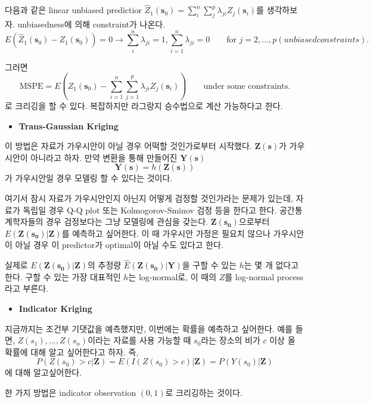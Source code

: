 \documentclass[b5paper,]{scrbook}
\providecommand{\tightlist}{%
  \setlength{\itemsep}{0pt}\setlength{\parskip}{0pt}}
\theoremstyle{plain}
\theoremstyle{definition}
\numberwithin{equation}{section}
\begin{document}
다음과 같은 linear unbiased predictior
\(\hat{Z}_{1}(\mathbf{s}_{0})=\sum_{i}^{n}\sum_{j}^{p}\lambda_{ji}Z_{j}(\mathbf{s}_{i})\)를
생각하보자. unbiasedness에 의해 constraint가 나온다.
\[E(\hat{Z}_{1}(\mathbf{s}_{0})-Z_{1}(\mathbf{s}_{0}))=0 \rightarrow \sum_{i}^{n}\lambda_{ji}=1, \sum_{i=1}^{n}\lambda_{ji}=0 \qquad \text{for } j=2,\ldots, p (unbiased constraints).\]

그러면
\[\text{MSPE}=E(Z_{1}(\mathbf{s}_{0})-\sum_{i=1}^{n}\sum_{j=1}^{p}\lambda_{ji}Z_{j}(\mathbf{s}_{i})) \qquad{\text{under some constraints.}}\]
로 크리깅을 할 수 있다. 복잡하지만 라그랑지 승수법으로 계산 가능하다고
한다.

\begin{itemize}
\tightlist
\item
  \textbf{Trans-Gaussian Kriging}
\end{itemize}

이 방법은 자료가 가우시안이 아닐 경우 어떡할 것인가로부터 시작했다.
\(\mathbf{Z}(\mathbf{s})\)가 가우시안이 아니라고 하자. 만약 변환을 통해
만들어진 \(\mathbf{Y}(\mathbf{s})\)
\[\mathbf{Y}(\mathbf{s})=h(\mathbf{Z}(\mathbf{s}))\] 가 가우시안일 경우
모델링 할 수 있다는 것이다.

여기서 잠시 자료가 가우시안인지 아닌지 어떻게 검정할 것인가라는 문제가
있는데, 자료가 독립일 경우 Q-Q plot 또는 Kolmogorov-Sminov 검정 등을
한다고 한다. 공간통계학자들의 경우 검정보다는 그냥 모델링에 관심을
갖는다. \(\mathbf{Z}(\mathbf{s_{0}})\)으로부터
\(E(\mathbf{Z}(\mathbf{s_{0}})|\mathbf{Z})\)를 예측하고 싶어한다. 이 때
가우시안 가정은 필요치 않으나 가우시안이 아닐 경우 이 predictor가
optimal이 아닐 수도 있다고 한다.

실제로 \(E(\mathbf{Z}(\mathbf{s_{0}})|\mathbf{Z})\)의 추정량
\(\hat{E}(\mathbf{Z}(\mathbf{s_{0}})|\mathbf{Y})\)을 구할 수 있는
\(h\)는 몇 개 없다고 한다. 구할 수 있는 가장 대표적인 \(h\)는
log-normal로, 이 때의 \(Z\)를 log-normal process라고 부른다.

\begin{itemize}
\tightlist
\item
  \textbf{Indicator Kriging}
\end{itemize}

지금까지는 조건부 기댓값을 예측했지만, 이번에는 확률을 예측하고
싶어한다. 예를 들면, \(Z(s_{1}), \ldots , Z(s_{n})\)이라는 자료를 사용
가능할 때 \(s_{0}\)라는 장소의 비가 \(c\) 이상 올 확률에 대해 알고
싶어한다고 하자. 즉,
\[P(Z(s_{0})>c |\mathbf{Z})=E(I(Z(s_{0})>c)|\mathbf{Z})=P(Y(s_{0})|\mathbf{Z})\]
에 대해 알고싶어한다.

한 가지 방법은 indicator observation \((0,1)\)로 크리깅하는 것이다.
\end{document}
